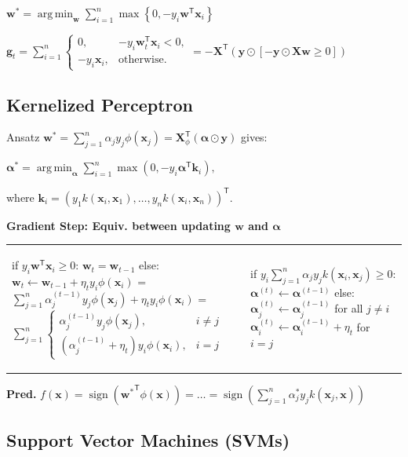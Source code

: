 \documentclass[a4paper,8pt,landscape]{extarticle}
\newcommand{\set}[1]{\left\{ #1 \right\}}
\newcommand*{\T}{\mathsf{T}}
\DeclareMathOperator{\sign}{sign}
\DeclareMathOperator*{\argmin}{arg\,min}
\newcommand{\mat}[1]{\mathbf{#1}}
\renewcommand{\vec}[1]{\mathbf{#1}}
\newcommand{\vg}{\vec{g}}
\newcommand{\vk}{\vec{k}}
\newcommand{\vw}{\vec{w}}
\newcommand{\vx}{\vec{x}}
\newcommand{\vy}{\vec{y}}
\newcommand{\valpha}{\boldsymbol{\alpha}}
\newcommand{\MX}{\mat{X}}
\begin{document}
\begin{multicols*}{3}
$\vw^*=\argmin_{\vw}\sum_{i=1}^n \max\set{0,-y_i\vw^\T\vx_i}$

$\vg_t= \sum_{i=1}^n \begin{cases}
0,& -y_i\vw_t^\T\vx_i < 0,\\
-y_i\vx_i,& \text{otherwise}.
\end{cases}
=-\MX^\T\left(\vy\odot\left[-\vy\odot\MX\vw \geq 0\right]\right)
$

\subsection{Kernelized Perceptron}

Ansatz 
$\vw^*=\sum_{j=1}^n 
\alpha_jy_j\phi(\vx_j)=\MX_\phi^\T(\valpha\odot\vy)$
gives:

$
\valpha^*=\argmin_{\valpha}\textstyle\sum_{i=1}^n \max\left(0,
-y_i\valpha^\T\vk_i\right),
$

where $\vk_i=(y_1k(\vx_i,\vx_1),\ldots,y_nk(\vx_i,\vx_n))^\T$.

\textbf{Gradient Step: Equiv. between updating $\vw$ and $\valpha$}\\
\begin{tabular}{ll}
\begin{Code}
if $y_i\vw^\T\vx_i \geq 0$:
  $\vw_t = \vw_{t-1}$
else:
  $\vw_t\leftarrow \vw_{t-1}+\eta_ty_i\phi(\vx_i)$
   = $\sum_{j=1}^n \alpha_j^{(t-1)}y_j\phi(\vx_j)+\eta_ty_i\phi(\vx_i)$
   = $\sum_{j=1}^n \begin{cases}
        \alpha_j^{(t-1)}y_j\phi(\vx_j), & i\neq j\\
        (\alpha_j^{(t-1)}+\eta_t)y_i\phi(\vx_i), &i=j
        \end{cases}$
\end{Code}
&
\begin{Code}
 if $y_i\sum_{j=1}^n\alpha_jy_jk(\vx_i,\vx_j)\geq 0$:
   $\valpha^{(t)} \leftarrow \valpha^{(t-1)}$
 else:
   $\valpha_j^{(t)} \leftarrow \valpha_j^{(t-1)}$ for all $j\neq i$
   $\valpha_i^{(t)} \leftarrow \valpha_i^{(t-1)}+\eta_t$ for $i=j$
\end{Code}\\
\end{tabular}

\textbf{Pred.}
$f(\vx)=\sign\left({\vw^*}^\T\phi(\vx)\right)=\ldots
=\sign\left(\sum_{j=1}^n \alpha_j^* y_jk(\vx_j,\vx)\right)
$

\subsection{Support Vector Machines (SVMs)}


\end{multicols*}
\end{document}
